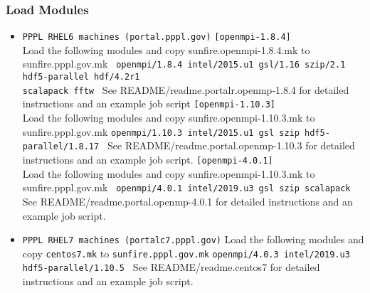 \subsubsection{Load Modules}
\begin{itemize}
\item{\texttt{PPPL RHEL6 machines (portal.pppl.gov)}}
\newline\newline
\texttt{[openmpi-1.8.4]}
\\Load the following modules and copy sunfire.openmpi-1.8.4.mk to sunfire.pppl.gov.mk
\newline\newline
\texttt{
openmpi/1.8.4 intel/2015.u1 gsl/1.16 szip/2.1 hdf5-parallel hdf/4.2r1 
\\
scalapack	fftw			
}
\newline\newline
See README/readme.portalr.openmp-1.8.4 for detailed instructions and an example job script
\newline\newline
\texttt{[openmpi-1.10.3]}
\\
Load the following modules and copy sunfire.openmpi-1.10.3.mk to sunfire.pppl.gov.mk
\newline\newline
\texttt{openmpi/1.10.3 intel/2015.u1 gsl szip hdf5-parallel/1.8.17 
}
\newline\newline
See README/readme.portal.openmp-1.10.3 for detailed instructions and an example job script.
\newline\newline
\texttt{[openmpi-4.0.1]}
\\
Load the following modules and copy sunfire.openmpi-1.10.3.mk to sunfire.pppl.gov.mk
\newline\newline
\texttt{
openmpi/4.0.1 intel/2019.u3 gsl	szip scalapack 
}
\newline\newline
See README/readme.portal.openmp-4.0.1 for detailed instructions and an example job script.
\item{\texttt{PPPL RHEL7 machines (portalc7.pppl.gov)}}
\newline\newline
Load the following modules and copy \texttt{centos7.mk} to \texttt{sunfire.pppl.gov.mk}
\newline\newline
\texttt{openmpi/4.0.3 intel/2019.u3 hdf5-parallel/1.10.5 
}
\newline\newline
See README/readme.centos7 for detailed instructions and an example job script.


\end{itemize}

